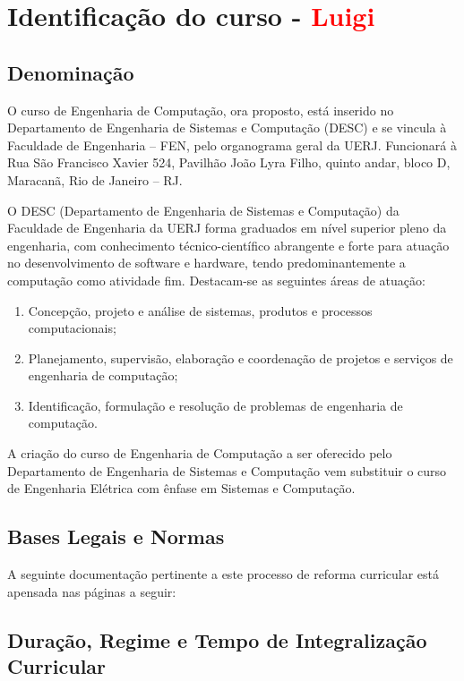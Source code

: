 \chapter{Identificação do curso - \textcolor{red}{Luigi}}

\section{Denominação}

O curso de Engenharia de Computação, ora proposto, está inserido no Departamento de Engenharia de Sistemas e Computação (DESC) e se vincula à Faculdade de Engenharia – FEN, pelo organograma geral da UERJ. Funcionará à Rua São Francisco Xavier 524, Pavilhão João Lyra Filho, quinto andar, bloco D, Maracanã, Rio de Janeiro – RJ.

O DESC (Departamento de Engenharia de Sistemas e Computação) da Faculdade de Engenharia da UERJ forma graduados em nível superior pleno da engenharia, com conhecimento técnico-científico abrangente e forte para atuação no desenvolvimento de software e hardware, tendo predominantemente a computação como atividade fim. Destacam-se as seguintes áreas de atuação:

\begin{enumerate}
	\item Concepção, projeto e análise de sistemas, produtos e processos computacionais;
	\item Planejamento, supervisão, elaboração e coordenação de projetos e serviços de engenharia de computação;
	\item Identificação, formulação e resolução de problemas de engenharia de computação.
\end{enumerate}

A criação do curso de Engenharia de Computação a ser oferecido pelo Departamento de Engenharia de Sistemas e Computação vem substituir o curso de Engenharia Elétrica com ênfase em Sistemas e Computação.

\section{Bases Legais e Normas}

A seguinte documentação pertinente a este processo de reforma curricular está apensada nas páginas a seguir:

\section{Duração, Regime e Tempo de Integralização Curricular}

